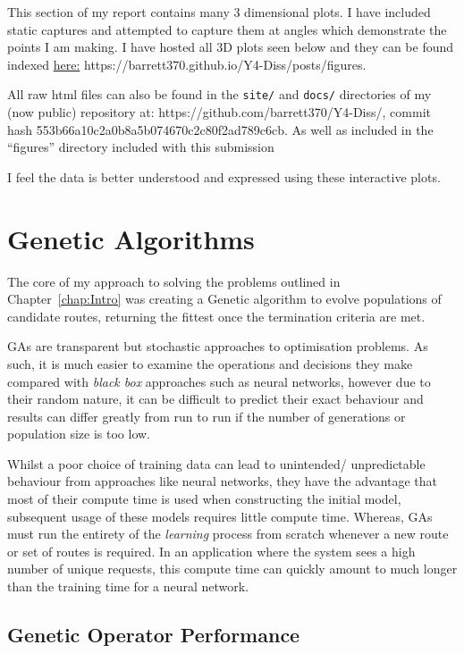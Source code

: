 This section of my report contains many 3 dimensional plots. I have included static captures and attempted to capture them at angles which demonstrate the points I am making. I have hosted all 3D plots seen below and they can be found indexed \href{https://barrett370.github.io/Y4-Diss/posts/figures}{here:} https://barrett370.github.io/Y4-Diss/posts/figures.

All raw html files can also be found in the \texttt{site/} and \texttt{docs/} directories of my (now public) repository at: https://github.com/barrett370/Y4-Diss/, commit hash 553b66a10c2a0b8a5b074670c2c80f2ad789c6cb. As well as included in the ``figures'' directory included with this submission

I feel the data is better understood and expressed using these interactive plots.

\section{Genetic Algorithms}
\label{sec:eval:GAs}

The core of my approach to solving the problems outlined in Chapter~\ref{chap:Intro} was creating a Genetic algorithm to evolve populations of candidate routes, returning the fittest once the termination criteria are met.

GAs are transparent but stochastic approaches to optimisation problems. As such, it is much easier to examine the operations and decisions they make compared with \textit{black box} approaches such as neural networks, however due to their random nature, it can be difficult to predict their exact behaviour and results can differ greatly from run to run if the number of generations or population size is too low.

Whilst a poor choice of training data can lead to unintended/ unpredictable behaviour from approaches like neural networks, they have the advantage that most of their compute time is used when constructing the initial model, subsequent usage of these models requires little compute time. Whereas, GAs must run the entirety of the \textit{learning} process from scratch whenever a new route or set of routes is required. In an application where the system sees a high number of unique requests, this compute time can quickly amount to much longer than the training time for a neural network.

\subsection{Genetic Operator Performance}

